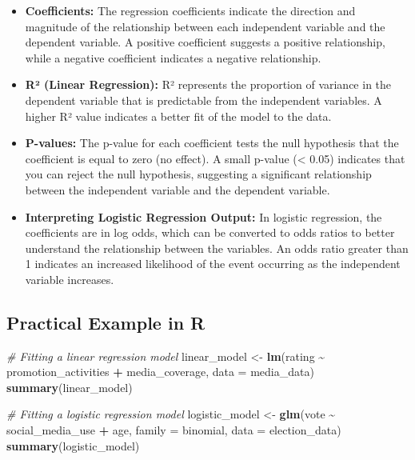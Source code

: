 \documentclass[
]{book}
\newenvironment{Shaded}{\begin{snugshade}}{\end{snugshade}}
\newcommand{\AttributeTok}[1]{\textcolor[rgb]{0.13,0.29,0.53}{#1}}
\newcommand{\CommentTok}[1]{\textcolor[rgb]{0.56,0.35,0.01}{\textit{#1}}}
\newcommand{\FunctionTok}[1]{\textcolor[rgb]{0.13,0.29,0.53}{\textbf{#1}}}
\newcommand{\NormalTok}[1]{#1}
\newcommand{\OtherTok}[1]{\textcolor[rgb]{0.56,0.35,0.01}{#1}}
\newcommand{\SpecialCharTok}[1]{\textcolor[rgb]{0.81,0.36,0.00}{\textbf{#1}}}
\begin{document}
\begin{itemize}
\item
  \textbf{Coefficients:} The regression coefficients indicate the direction and magnitude of the relationship between each independent variable and the dependent variable. A positive coefficient suggests a positive relationship, while a negative coefficient indicates a negative relationship.
\item
  \textbf{R² (Linear Regression):} R² represents the proportion of variance in the dependent variable that is predictable from the independent variables. A higher R² value indicates a better fit of the model to the data.
\item
  \textbf{P-values:} The p-value for each coefficient tests the null hypothesis that the coefficient is equal to zero (no effect). A small p-value (\textless{} 0.05) indicates that you can reject the null hypothesis, suggesting a significant relationship between the independent variable and the dependent variable.
\item
  \textbf{Interpreting Logistic Regression Output:} In logistic regression, the coefficients are in log odds, which can be converted to odds ratios to better understand the relationship between the variables. An odds ratio greater than 1 indicates an increased likelihood of the event occurring as the independent variable increases.
\end{itemize}

\subsection*{Practical Example in R}\label{practical-example-in-r}

\begin{Shaded}
\begin{Highlighting}[]
\CommentTok{\# Fitting a linear regression model}
\NormalTok{linear\_model }\OtherTok{\textless{}{-}} \FunctionTok{lm}\NormalTok{(rating }\SpecialCharTok{\textasciitilde{}}\NormalTok{ promotion\_activities }\SpecialCharTok{+}\NormalTok{ media\_coverage, }\AttributeTok{data =}\NormalTok{ media\_data)}
\FunctionTok{summary}\NormalTok{(linear\_model)}

\CommentTok{\# Fitting a logistic regression model}
\NormalTok{logistic\_model }\OtherTok{\textless{}{-}} \FunctionTok{glm}\NormalTok{(vote }\SpecialCharTok{\textasciitilde{}}\NormalTok{ social\_media\_use }\SpecialCharTok{+}\NormalTok{ age, }\AttributeTok{family =}\NormalTok{ binomial, }\AttributeTok{data =}\NormalTok{ election\_data)}
\FunctionTok{summary}\NormalTok{(logistic\_model)}
\end{Highlighting}
\end{Shaded}
\end{document}
